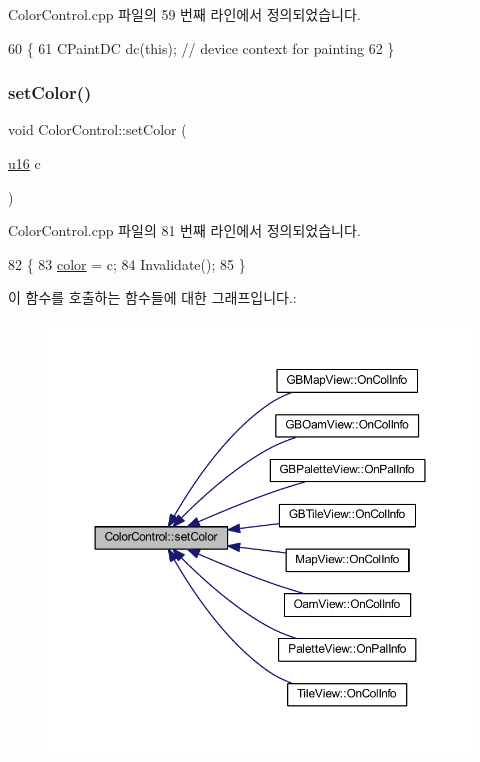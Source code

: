 Color\+Control.\+cpp 파일의 59 번째 라인에서 정의되었습니다.


\begin{DoxyCode}
60 \{
61   CPaintDC dc(\textcolor{keyword}{this}); \textcolor{comment}{// device context for painting}
62 \}
\end{DoxyCode}
\mbox{\label{class_color_control_ad4f5b637e57ab4e7c4ed718e66e491eb}} 
\subsubsection{\texorpdfstring{set\+Color()}{setColor()}}
{\footnotesize\ttfamily void Color\+Control\+::set\+Color (\begin{DoxyParamCaption}\item[{\mbox{\hyperlink{_system_8h_a9e6c91d77e24643b888dbd1a1a590054}{u16}}}]{c }\end{DoxyParamCaption})}



Color\+Control.\+cpp 파일의 81 번째 라인에서 정의되었습니다.


\begin{DoxyCode}
82 \{
83   \mbox{\hyperlink{class_color_control_adda78267113753c247e7edcaae47f927}{color}} = c;
84   Invalidate();
85 \}
\end{DoxyCode}
이 함수를 호출하는 함수들에 대한 그래프입니다.\+:
\nopagebreak
\begin{figure}[H]
\begin{center}
\leavevmode
\includegraphics[width=350pt]{class_color_control_ad4f5b637e57ab4e7c4ed718e66e491eb_icgraph}
\end{center}
\end{figure}


